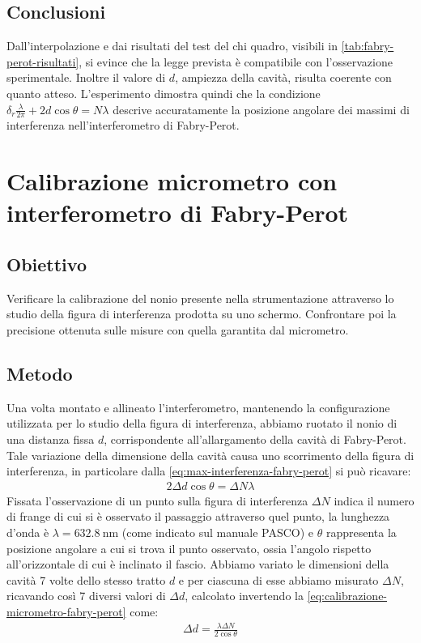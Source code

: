 \documentclass[a4paper]{article}
\begin{document}
\subsection{Conclusioni}
Dall'interpolazione e dai risultati del test del chi quadro, visibili in \cref{tab:fabry-perot-risultati}, si evince che la legge prevista è compatibile con l'osservazione sperimentale. Inoltre il valore di $d$, ampiezza della cavità, risulta coerente con quanto atteso. L'esperimento dimostra quindi che la condizione $\delta_r\frac{\lambda}{2\pi}+2d \cos \theta = N\lambda$ descrive accuratamente la posizione angolare dei massimi di interferenza nell'interferometro di Fabry-Perot.

\section{Calibrazione micrometro con interferometro di Fabry-Perot}
\subsection{Obiettivo}
Verificare la calibrazione del nonio presente nella strumentazione attraverso lo studio della figura di interferenza prodotta su uno schermo.
Confrontare poi la precisione ottenuta sulle misure con quella garantita dal micrometro.
\subsection{Metodo}
Una volta montato e allineato l'interferometro, mantenendo la configurazione utilizzata per lo studio della figura di interferenza, abbiamo ruotato il 
nonio di una distanza fissa $d$, corrispondente all'allargamento della cavità di Fabry-Perot. Tale variazione della dimensione della cavità causa uno
scorrimento della figura di interferenza, in particolare dalla \cref{eq:max-interferenza-fabry-perot} si può ricavare:
\begin{align}
    2 \Delta d \cos  \theta = \Delta N \lambda
\label{eq:calibrazione-micrometro-fabry-perot}
\end{align}
Fissata l'osservazione di un punto sulla figura di interferenza $\Delta N$ indica il numero di frange di cui si è osservato il passaggio attraverso quel punto, la lunghezza d'onda è $\lambda = \SI{632.8}{\nano\meter}$ (come indicato sul manuale PASCO) e $\theta$ rappresenta la posizione angolare a cui si trova il punto osservato, ossia l'angolo rispetto all'orizzontale di cui è inclinato il fascio.
Abbiamo variato le dimensioni della cavità 7 volte dello stesso tratto $d$ e per ciascuna di esse abbiamo misurato $\Delta N$, ricavando così 7 diversi valori di $\Delta d$, calcolato invertendo la \cref{eq:calibrazione-micrometro-fabry-perot} come:
\begin{align}
    \Delta d = \frac{\lambda \Delta N}{2\cos{\theta}}
\label{eq:calibrazione-micrometro-fabry-perot-invertita}
\end{align}
\end{document}
